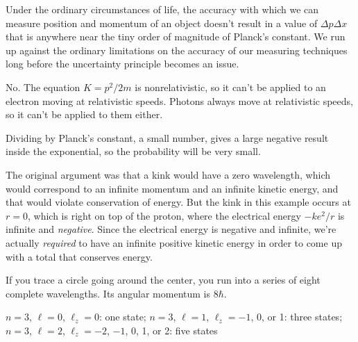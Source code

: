 Under the ordinary circumstances of life, the accuracy with which we can measure position 
and momentum of an object doesn't result in a value of $\Delta p\Delta x$ that is anywhere
 near the tiny order of magnitude of Planck's constant. We run up against the ordinary
 limitations on the accuracy of our measuring techniques long before the uncertainty
 principle becomes an issue.

No. The equation $K=p^2/2m$ is nonrelativistic, so it can't be applied to an electron
 moving at relativistic speeds. Photons always move at relativistic speeds, so it
 can't be applied to them either.

Dividing by Planck's constant, a small number, gives a large negative result inside the
 exponential, so the probability will be very small.

The original argument was that a kink would have a zero wavelength, which would correspond
to an infinite momentum and an infinite kinetic energy, and that would violate conservation
of energy. But the kink in this example occurs at $r=0$, which is right on top of the
proton, where the electrical energy $-ke^2/r$ is infinite and \emph{negative}. Since
the electrical energy is negative and infinite, we're actually \emph{required} to have
an infinite positive kinetic energy in order to come up with a total that conserves
energy.

If you trace a circle going around the center, you run into a series of eight complete
 wavelengths. Its angular momentum is $8\hbar$.

$n=3$, $\ell=0$, $\ell_z=0$: one state; 
$n=3$, $\ell=1$, $\ell_z=-1$, 0, or 1: three states; 
$n=3$, $\ell=2$, $\ell_z=-2$, $-1$, 0, 1, or 2: five states 





\noindent{}

\noindent{}\\

